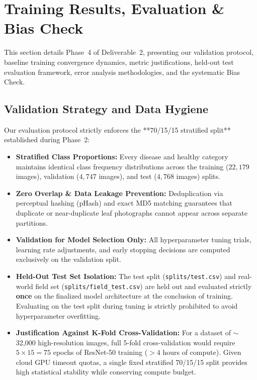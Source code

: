 \section{Training Results, Evaluation \& Bias Check}
\label{sec:evaluation}

This section details Phase~4 of Deliverable~2, presenting our validation protocol, baseline training convergence dynamics, metric justifications, held-out test evaluation framework, error analysis methodologies, and the systematic Bias Check.

\subsection{Validation Strategy and Data Hygiene}
\label{subsec:val_strategy}

Our evaluation protocol strictly enforces the **70/15/15 stratified split** established during Phase~2:
\begin{itemize}[leftmargin=*]
    \item \textbf{Stratified Class Proportions:} Every disease and healthy category maintains identical class frequency distributions across the training ($22,179$ images), validation ($4,747$ images), and test ($4,768$ images) splits.
    \item \textbf{Zero Overlap \& Data Leakage Prevention:} Deduplication via perceptual hashing (pHash) and exact MD5 matching guarantees that duplicate or near-duplicate leaf photographs cannot appear across separate partitions.
    \item \textbf{Validation for Model Selection Only:} All hyperparameter tuning trials, learning rate adjustments, and early stopping decisions are computed exclusively on the validation split. 
    \item \textbf{Held-Out Test Set Isolation:} The test split (\texttt{splits/test.csv}) and real-world field set (\texttt{splits/field\_test.csv}) are held out and evaluated strictly \textbf{once} on the finalized model architecture at the conclusion of training. Evaluating on the test split during tuning is strictly prohibited to avoid hyperparameter overfitting.
    \item \textbf{Justification Against K-Fold Cross-Validation:} For a dataset of $\sim$32,000 high-resolution images, full 5-fold cross-validation would require $5 \times 15 = 75$ epochs of ResNet-50 training ($>4$ hours of compute). Given cloud GPU timeout quotas, a single fixed stratified 70/15/15 split provides high statistical stability while conserving compute budget.
\end{itemize}

